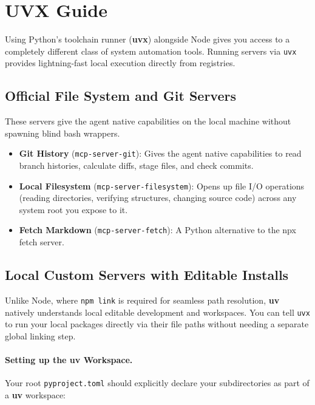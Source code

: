 \newpage
\section{UVX Guide}

Using Python's toolchain runner (\textbf{uvx}) alongside Node gives you access to a completely different class of system automation tools. Running servers via \lstinline[style=inline]|uvx| provides lightning-fast local execution directly from registries.

\subsection{Official File System and Git Servers}
These servers give the agent native capabilities on the local machine without spawning blind bash wrappers.

\begin{itemize}
    \item \textbf{Git History} (\lstinline[style=inline]|mcp-server-git|): Gives the agent native capabilities to read branch histories, calculate diffs, stage files, and check commits.
    \item \textbf{Local Filesystem} (\lstinline[style=inline]|mcp-server-filesystem|): Opens up file I/O operations (reading directories, verifying structures, changing source code) across any system root you expose to it.
    \item \textbf{Fetch Markdown} (\lstinline[style=inline]|mcp-server-fetch|): A Python alternative to the npx fetch server.
\end{itemize}

\subsection{Local Custom Servers with Editable Installs}
Unlike Node, where \lstinline[style=inline]|npm link| is required for seamless path resolution, \textbf{uv} natively understands local editable development and workspaces. You can tell \lstinline[style=inline]|uvx| to run your local packages directly via their file paths without needing a separate global linking step.

\paragraph{Setting up the uv Workspace.}
Your root \lstinline[style=inline]|pyproject.toml| should explicitly declare your subdirectories as part of a \textbf{uv} workspace:

